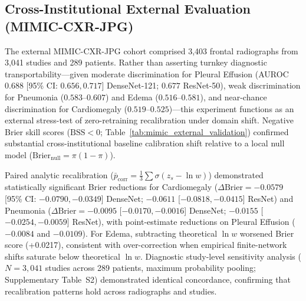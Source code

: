 \documentclass[preprint,12pt]{elsarticle}
\begin{document}
\subsection{Cross-Institutional External Evaluation (MIMIC-CXR-JPG)}
The external MIMIC-CXR-JPG cohort comprised 3,403 frontal radiographs from 3,041 studies and 289 patients. Rather than asserting turnkey diagnostic transportability—given moderate discrimination for Pleural Effusion (AUROC $0.688$ [95\% CI: $0.656, 0.717$] DenseNet-121; $0.677$ ResNet-50), weak discrimination for Pneumonia ($0.583$--$0.607$) and Edema ($0.516$--$0.581$), and near-chance discrimination for Cardiomegaly ($0.519$--$0.525$)—this experiment functions as an external stress-test of zero-retraining recalibration under domain shift. Negative Brier skill scores ($\text{BSS} < 0$; Table~\ref{tab:mimic_external_validation}) confirmed substantial cross-institutional baseline calibration shift relative to a local null model ($\text{Brier}_{\text{null}} = \pi(1-\pi)$).

Paired analytic recalibration ($\bar{p}_{\text{corr}} = \frac{1}{3}\sum \sigma(z_s - \ln w)$) demonstrated statistically significant Brier reductions for Cardiomegaly ($\Delta\text{Brier} = -0.0579$ [95\% CI: $-0.0790, -0.0349$] DenseNet; $-0.0611$ [$-0.0818, -0.0415$] ResNet) and Pneumonia ($\Delta\text{Brier} = -0.0095$ [$-0.0170, -0.0016$] DenseNet; $-0.0155$ [$-0.0254, -0.0059$] ResNet), with point-estimate reductions on Pleural Effusion ($-0.0084$ and $-0.0109$). For Edema, subtracting theoretical $\ln w$ worsened Brier score (+0.0217), consistent with over-correction when empirical finite-network shifts saturate below theoretical $\ln w$. Diagnostic study-level sensitivity analysis ($N = 3,041$ studies across 289 patients, maximum probability pooling; Supplementary Table~S2) demonstrated identical concordance, confirming that recalibration patterns hold across radiographs and studies.
\end{document}

